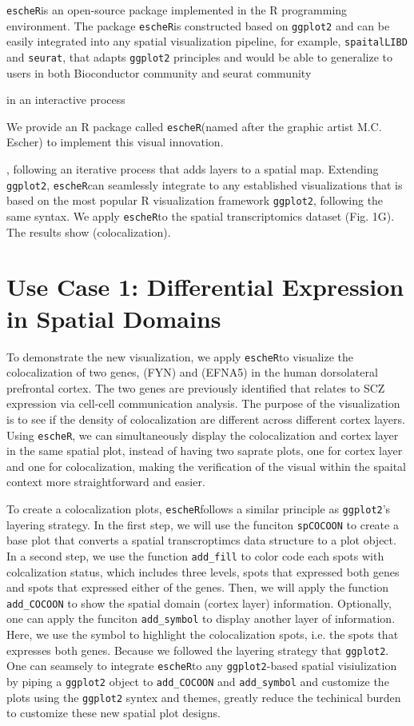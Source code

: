 \documentclass[11pt]{article}
\newcommand{\fixme}[1]{{\color{red} (#1)}}
\newcommand{\coloc}{\texttt{escheR}}
\begin{document}
\coloc is  an open-source package implemented in the R programming environment. The package \coloc is constructed based on \texttt{ggplot2} and can be easily integrated into any spatial visualization pipeline, for example, \texttt{spaitalLIBD} and \texttt{seurat}, that adapts \texttt{ggplot2} principles and would be able to generalize to users in both Bioconductor community and seurat community
 
 in an interactive process
 
 We provide an R package called \coloc (named after the graphic artist M.C. Escher) to implement this visual innovation. 
 
 
 , following an iterative process that adds layers to a spatial map. Extending \texttt{ggplot2}, \coloc can seamlessly integrate to any established visualizations that is based on the most popular R visualization framework \texttt{ggplot2}, following the same syntax. We apply \coloc to the spatial transcriptomics dataset (Fig. 1G). The results show \fixme{colocalization}.



\section*{Use Case 1: Differential Expression in Spatial Domains}
To demonstrate the new visualization, we apply \coloc to visualize the colocalization of two genes, (FYN) and (EFNA5) in the human dorsolateral prefrontal cortex. The two genes are previously identified that relates to SCZ expression via cell-cell communication analysis. The purpose of the visualization is to see if the density of colocalization are different across different cortex layers. Using \coloc, we can simultaneously display the colocalization and cortex layer in the same spatial plot, instead of having two saprate plots, one for cortex layer and one for colocalization, making the verification of the visual within the spaital context more straightforward and easier. 

To create a colocalization plots, \coloc follows a similar principle as \texttt{ggplot2}'s layering strategy. In the first step, we will use the funciton \texttt{spCOCOON} to create a base plot that converts a spatial transcroptimcs data structure to a plot object. In a second step, we use the function \texttt{add\_fill} to color code each spots with colcalization status, which includes three levels, spots that expressed both genes and spots that expressed either of the genes. Then, we will apply the function \texttt{add\_COCOON} to show the spatial domain (cortex layer) information. Optionally, one can apply the funciton \texttt{add\_symbol} to display another layer of information. Here, we use  the symbol to highlight the colocalization spots, i.e. the spots that expresses both genes. Because we followed the layering strategy that \texttt{ggplot2}. One can seamsely to integrate \coloc to any \texttt{ggplot2}-based spatial visiulization by piping a \texttt{ggplot2} object to \texttt{add\_COCOON} and \texttt{add\_symbol} and customize the plots using the \texttt{ggplot2} syntex and themes, greatly reduce the techinical burden to customize these new spatial plot designs.  
\end{document}
